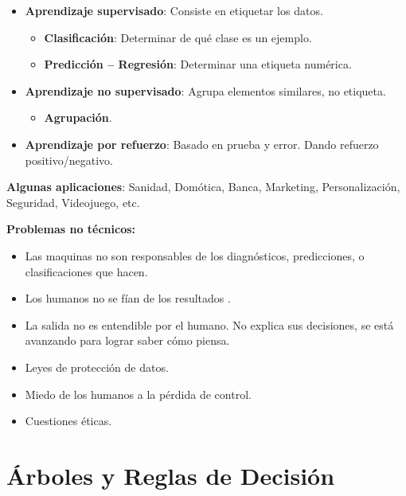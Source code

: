 \documentclass[12pt]{report} %
\begin{document}
\begin{itemize}

\item
  \textbf{Aprendizaje supervisado}: Consiste en etiquetar los datos.

  \begin{itemize}
  
  \item
    \textbf{Clasificación}: Determinar de qué clase es un ejemplo.
    
  \item
    \textbf{Predicción -- Regresión}: Determinar una etiqueta numérica.

  \end{itemize}
\item
  \textbf{Aprendizaje no supervisado}: Agrupa elementos similares, no
  etiqueta.

  \begin{itemize}
  
  \item
    \textbf{Agrupación}.
  \end{itemize}
\item
  \textbf{Aprendizaje por refuerzo}: Basado en prueba y error. Dando
  refuerzo positivo/negativo.
\end{itemize}

\textbf{Algunas aplicaciones}: Sanidad, Domótica, Banca, Marketing,
Personalización, Seguridad, Videojuego, etc.

\textbf{Problemas no técnicos:}

\begin{itemize}
\item
  Las maquinas no son responsables de los diagnósticos, predicciones, o
  clasificaciones que hacen.
\item
  Los humanos no se fían de los resultados .
\item
  La salida no es entendible por el humano. No explica sus decisiones,
  se está avanzando para lograr saber cómo piensa.
\item
  Leyes de protección de datos.
\item
  Miedo de los humanos a la pérdida de control.
\item
  Cuestiones éticas.
\end{itemize}

\chapter{Árboles y Reglas de Decisión}
\end{document}
